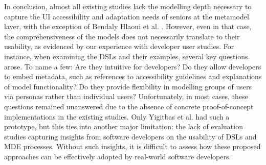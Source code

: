 In conclusion, almost all existing studies lack the modelling depth necessary to capture the UI accessibility and adaptation needs of seniors at the metamodel layer, with the exception of Bendaly Hlaoui et al. \cite{bendaly2018}. However, even in that case, the comprehensiveness of the models does not necessarily translate to their usability, as evidenced by our experience with developer user studies. For instance, when examining the DSLs and their examples, several key questions arose. To name a few: Are they intuitive for developers? Do they allow developers to embed metadata, such as references to accessibility guidelines and explanations of model functionality? Do they provide flexibility in modelling groups of users via personas rather than individual users? Unfortunately, in most cases, these questions remained unanswered due to the absence of concrete proof-of-concept implementations in the existing studies. Only Yigitbas et al. \cite{yigitbas2020} had such a prototype, but this ties into another major limitation: the lack of evaluation studies capturing insights from software developers on the usability of DSLs and MDE processes. Without such insights, it is difficult to assess how these proposed approaches can be effectively adopted by real-world software developers.